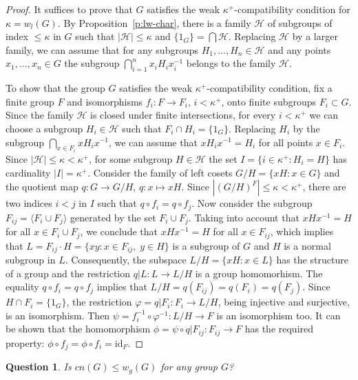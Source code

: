 \documentclass[11pt, twoside]{amsart}
\newtheorem{question}[theorem]{Question}
\theoremstyle{definition}
\begin{document}
\begin{proof} It suffices to prove that $G$ satisfies the weak $\kappa^+$-compatibility condition for $\kappa=w_l(G)$. By Proposition~\ref{p:lw-char}, there is a family $\mathcal H$ of subgroups of index $\le\kappa$ in $G$ such that $|\mathcal H|\le\kappa$ and $\{1_G\}=\bigcap{\mathcal H}$. Replacing ${\mathcal H}$ by a larger family, we can assume that for any subgroups $H_1,\dots,H_n\in{\mathcal H}$ and any points $x_1,\dots,x_n\in G$ the subgroup $\bigcap_{i=1}^nx_iH_ix_i^{-1}$ belongs to the family ${\mathcal H}$.

To show that the group $G$ satisfies the weak $\kappa^+$-compatibility condition, fix a finite group $F$ and  isomorphisms $f_i:F\to F_i$, $i<\kappa^+$, onto finite subgroups $F_i\subset G$. Since the family $\mathcal H$ is closed under finite intersections, for every
 $i<\kappa^+$ we can choose a subgroup $H_i\in\mathcal H$ such that $F_i\cap H_i=\{1_G\}$. Replacing $H_i$ by the subgroup $\bigcap_{x\in F_i}xH_ix^{-1}$, we can assume that $xH_ix^{-1}=H_i$ for all points $x\in F_i$. Since $|\mathcal H|\le\kappa<\kappa^+$, for some subgroup $H\in{\mathcal H}$ the set $I=\{i\in\kappa^+:H_i=H\}$ has cardinality $|I|=\kappa^+$. Consider the family of left cosets $G/H=\{xH:x\in G\}$ and the quotient map $q:G\to G/H$, $q:x\mapsto xH$. Since $|(G/H)^F|\le\kappa<\kappa^+$, there are two indices $i<j$ in $I$ such that $q\circ f_i=q\circ f_j$. Now consider the subgroup $F_{ij}=\langle F_i\cup F_j\rangle$ generated by the set $F_i\cup F_j$. Taking into account that $xHx^{-1}=H$ for all $x\in F_i\cup F_j$, we conclude that $xHx^{-1}=H$ for all $x\in F_{ij}$, which implies that $L=F_{ij}\cdot H=\{xy:x\in F_{ij},\;y\in H\}$ is a subgroup of $G$ and $H$ is a normal subgroup in $L$. Consequently, the subspace $L/H=\{xH:x\in L\}$ has the structure of a group and the restriction $q|L:L\to L/H$ is a group homomorhism. The equality $q\circ f_i=q\circ f_j$ implies that $L/H=q(F_{ij})=q(F_i)=q(F_j)$. Since $H\cap F_i=\{1_G\}$, the restriction $\varphi=q|F_i:F_i\to L/H$, being injective and surjective, is an isomorphism.
Then $\psi=f_i^{-1}\circ\varphi^{-1}:L/H\to F$ is an isomorphism too. It can be shown that the homomorphism $\phi=\psi\circ q|F_{ij}:F_{ij}\to F$ has the required property: $\phi\circ f_j=\phi\circ f_i={\mathrm{id}}_F$.
\end{proof}

\begin{question} Is ${cn}(G)\le w_g(G)$ for any group $G$?
\end{question}
\end{document}
